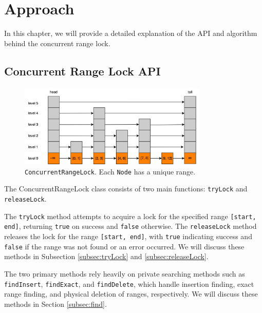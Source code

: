 \chapter{Approach}\label{ch:approach}

In this chapter, we will provide a detailed explanation of the API and algorithm behind the concurrent range lock.

\section{Concurrent Range Lock API}\label{sec:api}

\begin{figure}[h]
    \centering
    \includegraphics[width=0.8\textwidth]{./figures/rangelock.png}
    \caption{\texttt{ConcurrentRangeLock}. Each \texttt{Node} has a unique range.}
    \label{fig:concurrent_range_lock}
\end{figure}

The ConcurrentRangeLock class consists of two main functions: \texttt{tryLock} and \texttt{releaseLock}.

The \texttt{tryLock} method attempts to acquire a lock for the specified range \texttt{[start, end]}, returning \texttt{true} on success and \texttt{false} otherwise.
The \texttt{releaseLock} method releases the lock for the range \texttt{[start, end]}, with \texttt{true} indicating success and \texttt{false} if the range was not found or an error occurred.
We will discuss these methods in Subsection \ref{subsec:tryLock} and \ref{subsec:releaseLock}.

The two primary methods rely heavily on private searching methods such as \texttt{findInsert}, \texttt{findExact}, and \texttt{findDelete}, which handle insertion finding, exact range finding, and physical deletion of ranges, respectively. We will discuss these methods in Section \ref{subsec:find}.

\begin{figure}[h]
    \centering
    
\end{figure}

